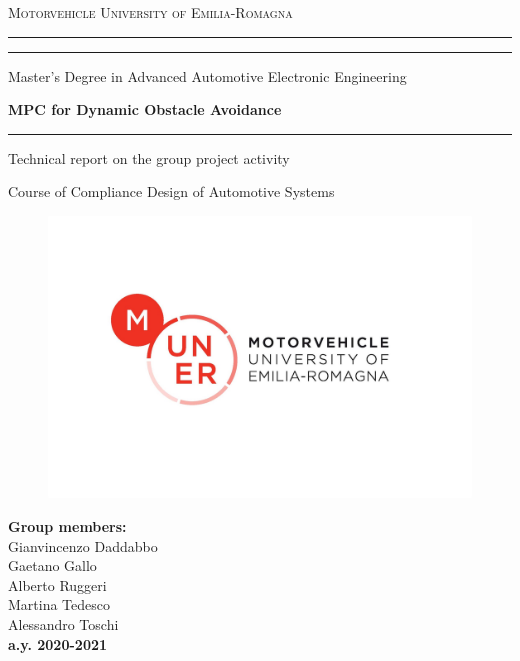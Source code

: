 \documentclass[11pt,a4paper]{article}
\begin{document}
\justifying


\begin{titlepage}
\begin{center}
{{\Large{\textsc{Motorvehicle University of Emilia-Romagna}}}} \rule[0.1cm]{15.8cm}{0.1mm}
\rule[0.5cm]{15.8cm}{0.6mm}
Master's Degree in Advanced Automotive Electronic Engineering

\end{center}

\vspace{15mm}
\begin{center}
{\LARGE{\bf MPC for Dynamic Obstacle Avoidance}}
\rule[0.1cm]{15.8cm}{0.1mm}
\begin{LARGE}

Technical report on the group project activity\\


\end{LARGE}
\vspace{5mm}
Course of Compliance Design of Automotive Systems
\end{center}

\begin{center}
 \begin{figure}[H]
          \includegraphics[width=1\textwidth]{Figures/MUNER_logo.jpg}
          \end{figure}

 {\large\bf Group members:\\}
 {Gianvincenzo Daddabbo}\\
{Gaetano Gallo}\\
{Alberto Ruggeri}\\
{Martina Tedesco}\\
{Alessandro Toschi}\\



\vspace{4mm}
{\large\bf a.y. 2020-2021}
\end{center}
\end{titlepage}
\end{document}
